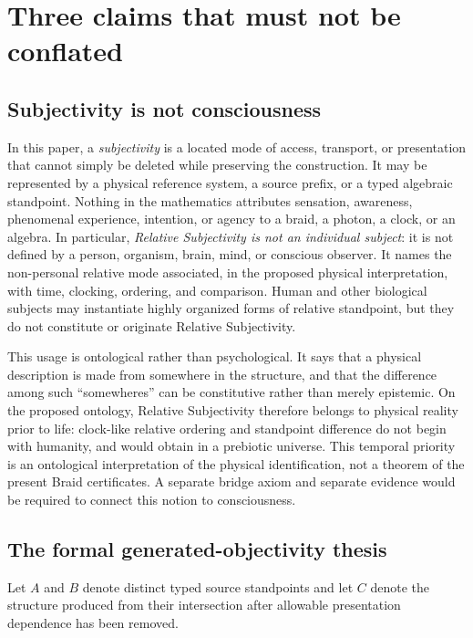 \documentclass[11pt]{article}
\theoremstyle{definition}
\theoremstyle{remark}
\begin{document}
\section{Three claims that must not be conflated}

\subsection{Subjectivity is not consciousness}

In this paper, a \emph{subjectivity} is a located mode of access, transport, or presentation that cannot simply be deleted while preserving the construction. It may be represented by a physical reference system, a source prefix, or a typed algebraic standpoint. Nothing in the mathematics attributes sensation, awareness, phenomenal experience, intention, or agency to a braid, a photon, a clock, or an algebra. In particular, \emph{Relative Subjectivity is not an individual subject}: it is not defined by a person, organism, brain, mind, or conscious observer. It names the non-personal relative mode associated, in the proposed physical interpretation, with time, clocking, ordering, and comparison. Human and other biological subjects may instantiate highly organized forms of relative standpoint, but they do not constitute or originate Relative Subjectivity.

This usage is ontological rather than psychological. It says that a physical description is made from somewhere in the structure, and that the difference among such ``somewheres'' can be constitutive rather than merely epistemic. On the proposed ontology, Relative Subjectivity therefore belongs to physical reality prior to life: clock-like relative ordering and standpoint difference do not begin with humanity, and would obtain in a prebiotic universe. This temporal priority is an ontological interpretation of the physical identification, not a theorem of the present Braid certificates. A separate bridge axiom and separate evidence would be required to connect this notion to consciousness.

\subsection{The formal generated-objectivity thesis}

Let $A$ and $B$ denote distinct typed source standpoints and let $C$ denote the structure produced from their intersection after allowable presentation dependence has been removed.
\end{document}

